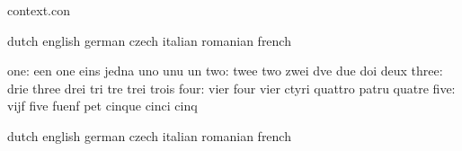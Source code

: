 


\startlogginginterface context.con



\startvariables            dutch                     english
                           german                    czech
                           italian                   romanian
                           french

                      one: een                       one
                           eins                      jedna
                           uno                       unu
                           un
                      two: twee                      two
                           zwei                      dve
                           due                       doi
                           deux
                    three: drie                      three
                           drei                      tri
                           tre                       trei
                           trois
                     four: vier                      four
                           vier                      ctyri
                           quattro                   patru
                           quatre
                     five: vijf                      five
                           fuenf                     pet
                           cinque                    cinci
                           cinq
\stopvariables


\startvariables            dutch                     english
                           german                    czech
                           italian                   romanian
                           french


